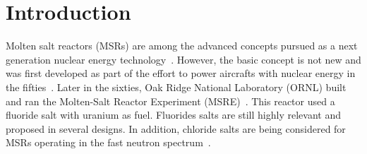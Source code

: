\documentclass[preprint,3p,10pt,twocolumn,number,sort&compress]{elsarticle}
\begin{document}

\section{Introduction}
\label{sec:intro}
Molten salt reactors (MSRs) are among the advanced concepts pursued as a next generation nuclear energy technology~\cite{}. However, the basic concept is not new and was first developed as part of the effort to power aircrafts with nuclear energy in the fifties~\cite{}. Later in the sixties, Oak Ridge National Laboratory (ORNL) built and ran the Molten-Salt Reactor Experiment (MSRE)~\cite{}. This reactor used a fluoride salt with uranium as fuel. Fluorides salts are still highly relevant and proposed in several designs. In addition, chloride salts are being considered for MSRs operating in the fast neutron spectrum~\cite{}. 
\end{document}
